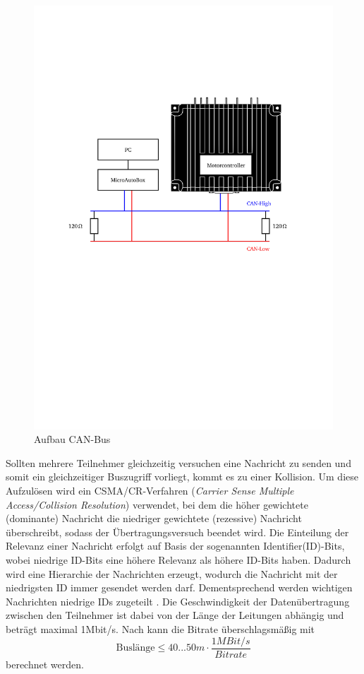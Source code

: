 \begin{figure}[h]
	\centering
		\includegraphics{Bilder/CAN2.pdf}
	\caption{Aufbau CAN-Bus \cite[S.158]{manual}}
	\label{fig:CAN}
\end{figure}

Sollten mehrere Teilnehmer gleichzeitig versuchen eine Nachricht zu senden und somit ein gleichzeitiger Buszugriff vorliegt, kommt es zu einer Kollision. Um diese Aufzulösen wird ein CSMA/CR-Verfahren (\textit{Carrier Sense Multiple Access/Collision Resolution}) verwendet, bei dem die höher gewichtete (dominante) Nachricht die niedriger gewichtete (rezessive) Nachricht überschreibt, sodass der Übertragungsversuch beendet wird. Die Einteilung der Relevanz einer Nachricht erfolgt auf Basis der sogenannten Identifier(ID)-Bits, wobei niedrige ID-Bits eine höhere Relevanz als höhere ID-Bits haben. Dadurch wird eine Hierarchie der Nachrichten erzeugt, wodurch die Nachricht mit der niedrigsten ID immer gesendet werden darf. Dementsprechend werden wichtigen Nachrichten niedrige IDs zugeteilt \cite{Lawrenz2010}. 
Die Geschwindigkeit der Datenübertragung zwischen den Teilnehmer ist dabei von der Länge der Leitungen abhängig und beträgt maximal 1Mbit/s. Nach \cite[S.58]{Werner2014} kann die Bitrate überschlagsmäßig mit 
\begin{equation}
	\text{Buslänge}\leq 40...50 m\cdot \frac{1MBit/s}{Bitrate}
	\label{eq:CAN}
\end{equation}
berechnet werden.

